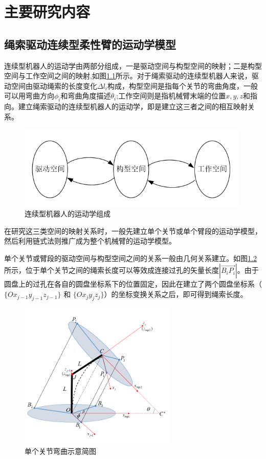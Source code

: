 \chapter{主要研究内容}
\section{绳索驱动连续型柔性臂的运动学模型}
	连续型机器人的运动学由两部分组成，一是驱动空间与构型空间的映射；二是构型空间与工作空间之间的映射,如图\ref{fig:map}所示。对于绳索驱动的连续型机器人来说，驱动空间由驱动绳索的长度变化$\Delta l_i$构成，构型空间是指每个关节的弯曲角度，一般可以用弯曲方向$\phi_i$和弯曲角度描述$\theta_i$;工作空间则是指机械臂末端的位置$x,y,z$和指向。建立绳索驱动的连续型机器人的运动学，即是建立这三者之间的相互映射关系。
	\begin{figure}[h]
		\centering
		\includegraphics[height=4cm]{figures/map.png}
		\caption{连续型机器人的运动学组成}
		\label{fig:map}
	\end{figure}

	在研究这三类空间的映射关系时，一般先建立单个关节或单个臂段的运动学模型，然后利用链式法则推广成为整个机械臂的运动学模型。
	
	单个关节或臂段的驱动空间与构型空间之间的关系一般由几何关系建立。如图\ref{fig:single_joint}所示，位于单个关节之间的绳索长度可以等效成连接过孔的矢量长度$| \overrightarrow{B_i P_i}| $。由于圆盘上的过孔在各自的圆盘坐标系下的位置固定，因此在建立了两个圆盘坐标系（$\{O x_{j-1} y_{j-1} z_{j-1}\}$ 和 $\{O x_{j} y_{j} z_{j}\}$）的坐标变换关系之后，即可得到绳索长度。
	\begin{figure}[h]
		\centering
		\includegraphics[height=7cm]{figures/single_joint.png}
		\caption{单个关节弯曲示意简图}
		\label{fig:single_joint}
	\end{figure}

